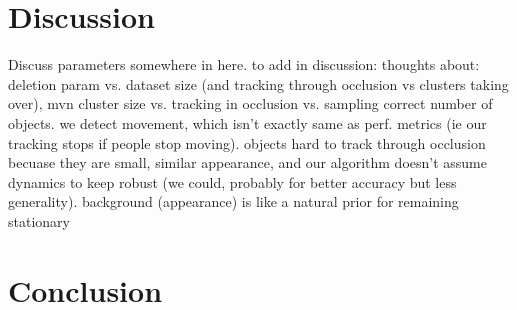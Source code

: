 \documentclass[smallcondensed, final]{svjour3}
\newcommand{\willie}[1]{\textcolor{green}{\textsf{\emph{\textbf{\textcolor{green}{#1}}}}}}
\begin{document}








\section*{Discussion}
\label{sec:discussion}

Discuss parameters somewhere in here. to add in discussion: thoughts about: deletion param vs. dataset size (and tracking through occlusion vs clusters taking over), mvn cluster size vs. tracking in occlusion vs. sampling correct number of objects.  we detect movement, which isn’t exactly same as perf. metrics (ie our tracking stops if people stop moving). objects hard to track through occlusion becuase they are small, similar appearance, and our algorithm doesn’t assume dynamics to keep robust (we could, probably for better accuracy but less generality). background (appearance) is like a natural prior for remaining stationary




\section*{Conclusion}















\begin{small}

 
\end{small}
\end{document}
